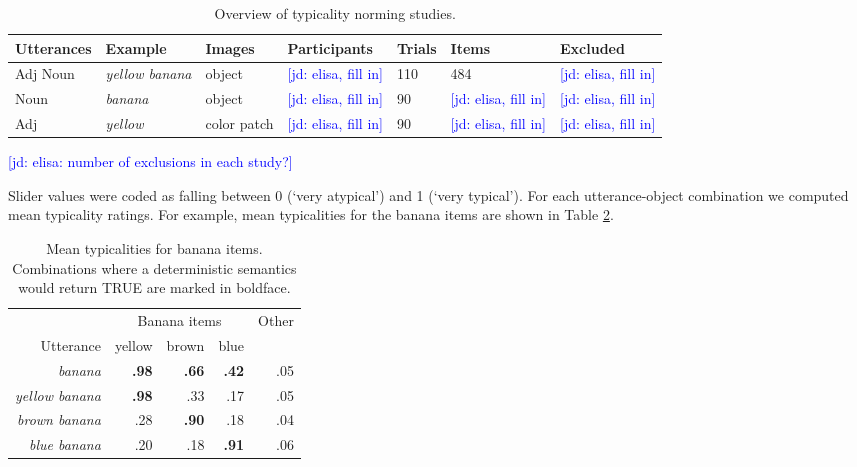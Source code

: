 \documentclass[10pt,letterpaper]{article}
\newcommand{\jd}[1]{\textcolor{Blue}{[jd: #1]}}
\newcommand{\tableref}[1]{Table \ref{#1}}
\begin{document}
\begin{table}
\caption{Overview of typicality norming studies.}
\begin{tabular}{l l l l l l l}
\toprule
Utterances & Example & Images & Participants & Trials & Items & Excluded\\
\midrule
Adj Noun & \emph{yellow banana} & object & \jd{elisa, fill in} & 110 & 484 & \jd{elisa, fill in}\\ 
Noun & \emph{banana} & object & \jd{elisa, fill in} & 90 & \jd{elisa, fill in} & \jd{elisa, fill in}\\
Adj & \emph{yellow} & color patch & \jd{elisa, fill in} & 90 & \jd{elisa, fill in} & \jd{elisa, fill in}\\
\bottomrule
\end{tabular}
\label{tab:normingoverview}
\end{table}

\jd{elisa: number of exclusions in each study?}

Slider values were coded as falling between 0 (`very atypical') and 1 (`very typical'). For each utterance-object combination we computed mean typicality ratings. For example, mean typicalities for the banana items are shown in \tableref{tab:bananatypicalities}.

\begin{table}
\caption{Mean typicalities for banana items. Combinations where a deterministic semantics would return TRUE are marked in boldface.}
\begin{tabular}{r r r r r}
\toprule
 & \multicolumn{3}{c}{Banana items} & Other \\
 Utterance & yellow & brown  & blue & \\ 
 \midrule
\emph{banana} & \textbf{.98} & \textbf{.66} & \textbf{.42} & .05  \\
 \midrule
\emph{yellow banana} & \textbf{.98} & .33 & .17 & .05 \\
\emph{brown banana} & .28 & \textbf{.90} & .18 & .04\\
\emph{blue banana} & .20 & .18 & \textbf{.91} & .06\\
\bottomrule
\end{tabular}
\label{tab:bananatypicalities}
\end{table}
\end{document}
